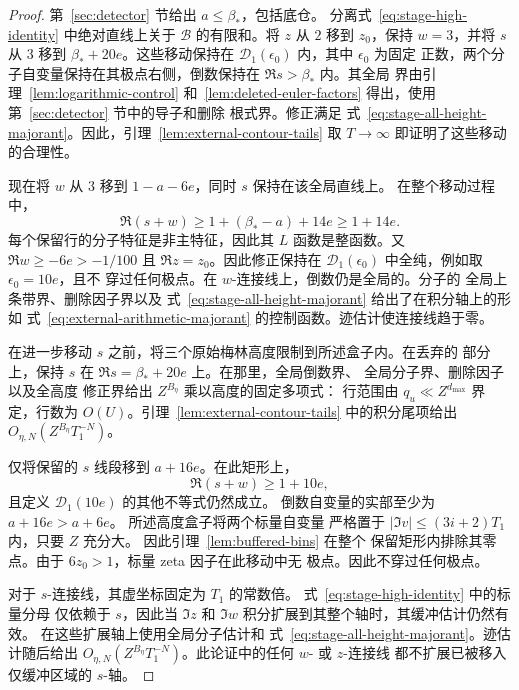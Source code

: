 \documentclass[11pt,a4paper]{article}
\numberwithin{equation}{section}
\numberwithin{figure}{section}
\theoremstyle{definition}
\theoremstyle{remark}
\begin{document}
\begin{proof}

第~\ref{sec:detector} 节给出 $a\le\beta_*$，包括底仓。
分离式~\eqref{eq:stage-high-identity} 中绝对直线上关于 $\mathcal B$
的有限和。将
$z$ 从 $2$ 移到 $z_0$，保持 $w=3$，并将 $s$ 从 $3$ 移到
$\beta_*+20e$。这些移动保持在 $\mathcal D_1(\epsilon_0)$ 内，其中 $\epsilon_0$ 为固定
正数，两个分子自变量保持在其极点右侧，倒数保持在 $\Re s>\beta_*$ 内。其全局
界由引理~\ref{lem:logarithmic-control}
和~\ref{lem:deleted-euler-factors} 得出，使用第~\ref{sec:detector} 节中的导子和删除
根式界。修正满足
式~\eqref{eq:stage-all-height-majorant}。因此，引理~\ref{lem:external-contour-tails}
取 $T\to\infty$ 即证明了这些移动的合理性。

现在将 $w$ 从 $3$ 移到 $1-a-6e$，同时 $s$ 保持在该全局直线上。
在整个移动过程中，
\[
 \Re(s+w)\ge1+(\beta_*-a)+14e\ge1+14e.
\]
每个保留行的分子特征是非主特征，因此其
$L$ 函数是整函数。又 $\Re w\ge-6e>-1/100$ 且
$\Re z=z_0$。因此修正保持在
$\mathcal D_1(\epsilon_0)$ 中全纯，例如取 $\epsilon_0=10e$，且不
穿过任何极点。在 $w$-连接线上，倒数仍是全局的。分子的
全局上条带界、删除因子界以及
式~\eqref{eq:stage-all-height-majorant} 给出了在积分轴上的形如
式~\eqref{eq:external-arithmetic-majorant} 的控制函数。迹估计使连接线趋于零。

在进一步移动 $s$ 之前，将三个原始梅林高度限制到所述盒子内。在丢弃的
部分上，保持 $s$ 在 $\Re s=\beta_*+20e$ 上。在那里，全局倒数界、
全局分子界、删除因子以及全高度
修正界给出 $Z^{B_\eta}$ 乘以高度的固定多项式：
行范围由 $q_u\ll Z^{d_{\max}}$ 界定，行数为
$O(U)$。引理~\ref{lem:external-contour-tails} 中的积分尾项给出
$O_{\eta,N}(Z^{B_\eta}T_1^{-N})$。

仅将保留的 $s$ 线段移到 $a+16e$。在此矩形上，
\[
 \Re(s+w)\ge1+10e,
\]
且定义 $\mathcal D_1(10e)$ 的其他不等式仍然成立。
倒数自变量的实部至少为 $a+16e>a+6e$。
所述高度盒子将两个标量自变量
严格置于 $|\Im v|\le(3i+2)T_1$ 内，只要 $Z$ 充分大。
因此引理~\ref{lem:buffered-bins} 在整个
保留矩形内排除其零点。由于 $6z_0>1$，标量 zeta 因子在此移动中无
极点。因此不穿过任何极点。

对于 $s$-连接线，其虚坐标固定为 $T_1$ 的常数倍。
式~\eqref{eq:stage-high-identity} 中的标量分母
仅依赖于 $s$，因此当 $\Im z$ 和 $\Im w$ 积分扩展到其整个轴时，其缓冲估计仍然有效。
在这些扩展轴上使用全局分子估计和
式~\eqref{eq:stage-all-height-majorant}。迹估计随后给出
$O_{\eta,N}(Z^{B_\eta}T_1^{-N})$。此论证中的任何 $w$- 或 $z$-连接线
都不扩展已被移入仅缓冲区域的 $s$-轴。\end{proof}
\end{document}
